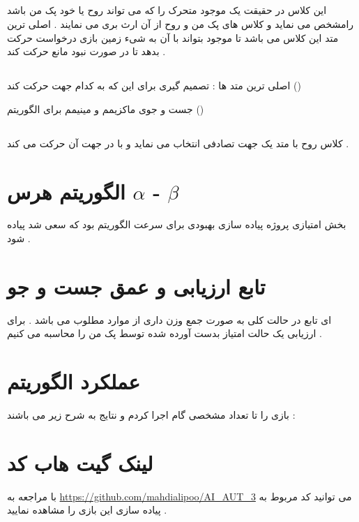 \subsection{}
این کلاس در حقیقت یک موجود متحرک را که می تواند روح یا خود پک من باشد رامشخص می نماید و کلاس های پک من و روح از آن ارث بری می نمایند . اصلی ترین متد این کلاس 
می باشد تا موجود بتواند با آن به شیء زمین بازی 
 درخواست حرکت بدهد تا در صورت نبود مانع حرکت کند . 
\subsection{}
اصلی ترین متد ها : تصمیم گیری برای این که به کدام جهت حرکت کند 
 ()

جست و جوی ماکزیمم و مینیمم برای الگوریتم 
 ()

\subsection{}
کلاس روح با متد 
یک جهت تصادفی انتخاب می نماید و با 
در جهت آن حرکت می کند .
\section{الگوریتم هرس $\alpha$ - $\beta$}
بخش امتیازی پروژه پیاده سازی بهبودی برای سرعت الگوریتم بود که سعی شد پیاده شود .
\section{تابع ارزیابی و عمق جست و جو}
ای تابع در حالت کلی به صورت جمع وزن داری از موارد مطلوب می باشد . برای ارزیابی یک حالت امتیاز بدست آورده شده توسط پک من را محاسبه می کنیم .
\section{عملکرد الگوریتم}
بازی را تا تعداد مشخصی گام اجرا کردم و نتایج به شرح زیر می باشند :
\section{لینک گیت هاب کد}
با مراجعه به 
\url{https://github.com/mahdialipoo/AI_AUT_3}
می توانید کد مربوط به پیاده سازی این بازی را مشاهده نمایید .
